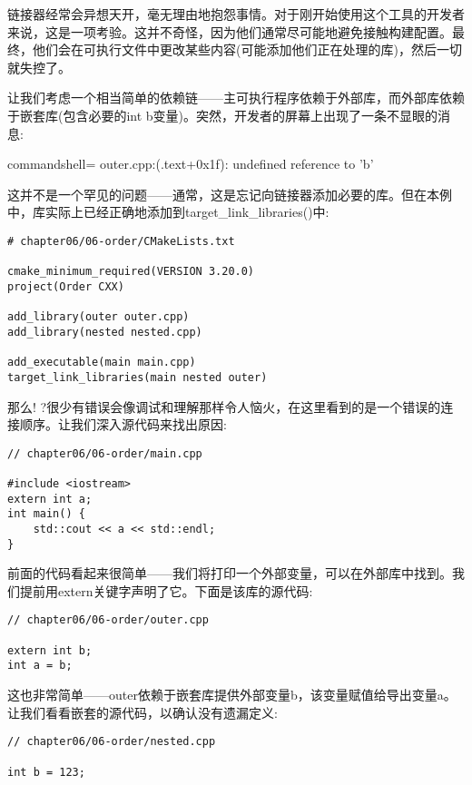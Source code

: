 链接器经常会异想天开，毫无理由地抱怨事情。对于刚开始使用这个工具的开发者来说，这是一项考验。这并不奇怪，因为他们通常尽可能地避免接触构建配置。最终，他们会在可执行文件中更改某些内容(可能添加他们正在处理的库)，然后一切就失控了。

让我们考虑一个相当简单的依赖链——主可执行程序依赖于外部库，而外部库依赖于嵌套库(包含必要的int b变量)。突然，开发者的屏幕上出现了一条不显眼的消息:

\begin{tcblisting}{commandshell={}}
outer.cpp:(.text+0x1f): undefined reference to 'b'
\end{tcblisting}

这并不是一个罕见的问题——通常，这是忘记向链接器添加必要的库。但在本例中，库实际上已经正确地添加到target\_link\_libraries()中:

\begin{lstlisting}[style=styleCMake]
# chapter06/06-order/CMakeLists.txt

cmake_minimum_required(VERSION 3.20.0)
project(Order CXX)

add_library(outer outer.cpp)
add_library(nested nested.cpp)

add_executable(main main.cpp)
target_link_libraries(main nested outer)
\end{lstlisting}

那么! ?很少有错误会像调试和理解那样令人恼火，在这里看到的是一个错误的连接顺序。让我们深入源代码来找出原因:

\begin{lstlisting}[style=styleCXX]
// chapter06/06-order/main.cpp

#include <iostream>
extern int a;
int main() {
	std::cout << a << std::endl;
}
\end{lstlisting}

前面的代码看起来很简单——我们将打印一个外部变量，可以在外部库中找到。我们提前用extern关键字声明了它。下面是该库的源代码:

\begin{lstlisting}[style=styleCXX]
// chapter06/06-order/outer.cpp

extern int b;
int a = b;
\end{lstlisting}

这也非常简单——outer依赖于嵌套库提供外部变量b，该变量赋值给导出变量a。让我们看看嵌套的源代码，以确认没有遗漏定义:

\begin{lstlisting}[style=styleCXX]
// chapter06/06-order/nested.cpp

int b = 123;
\end{lstlisting}

